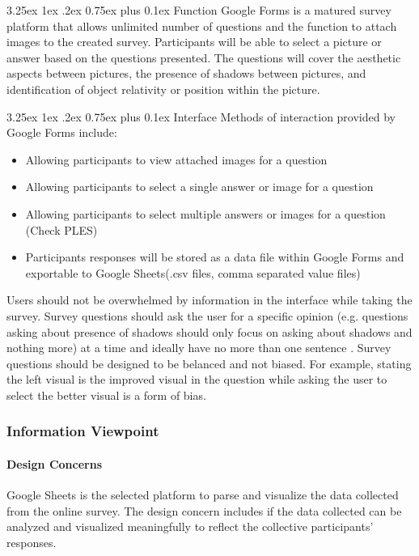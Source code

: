 \documentclass[10pt,journal,compsoc,draftclsnofoot]{IEEEtran}
\makeatletter
\newcommand\subparagraph{%
  \@startsection{subparagraph}{5}
  {\parindent}
  {3.25ex \@plus 1ex \@minus .2ex}
  {0.75ex plus 0.1ex}
  {\normalfont\normalsize\bfseries}}
\makeatother
\begin{document}
\begin{flushleft}
\subparagraph{Function}
Google Forms \cite{googleforms} is a matured survey platform that allows unlimited number of questions and the function to attach images to the created survey.
Participants will be able to select a picture or answer based on the questions presented. 
The questions will cover the aesthetic aspects between pictures, the presence of shadows between pictures, and identification of object relativity or position within the picture. 

\subparagraph{Interface}
Methods of interaction provided by Google Forms include:
\begin{itemize}
\item Allowing participants to view attached images for a question
\item Allowing participants to select a single answer or image for a question
\item Allowing participants to select multiple answers or images for a question (Check PLES)
\item Participants responses will be stored as a data file within Google Forms and exportable to Google Sheets(.csv files, comma separated value files)
\end{itemize}

Users should not be overwhelmed by information in the interface while taking the survey.
Survey questions should ask the user for a specific opinion (e.g. questions asking about presence of shadows should only focus on asking about shadows and nothing more) at a time and ideally have no more than one sentence \cite{SMquestions}. 
Survey questions should be designed to be belanced and not biased.
For example, stating the left visual is the improved visual in the question while asking the user to select the better visual is a form of bias.  

\newpage

\subsubsection{Information Viewpoint}
\paragraph{Design Concerns}
Google Sheets \cite{googlesheets} is the selected platform to parse and visualize the data collected from the online survey. 
The design concern includes if the data collected can be analyzed and visualized meaningfully to reflect the collective participants’ responses.
\vspace{3mm}


\end{flushleft}
\end{document}
